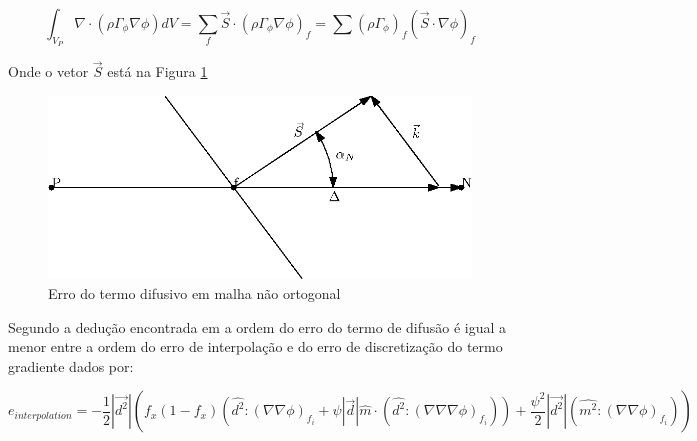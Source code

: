 \begin{equation}
    \int_{V_P} \nabla \cdot (\rho \Gamma_\phi \nabla\phi)dV = \sum_f \vec{S} \cdot (\rho \Gamma_\phi \nabla \phi)_f = \sum (\rho \Gamma_\phi)_f (\vec{S} \cdot \nabla \phi)_f
\end{equation}

Onde o vetor $\vec{S}$ está na Figura \ref{fig:non-orthogonality}

\begin{figure}[]
    \centering
    \includegraphics{fig/non-orthogonality.eps}
    \caption{Erro do termo difusivo em malha não ortogonal}
    \label{fig:non-orthogonality}
\end{figure}





Segundo a dedução encontrada em \cite{Juretic2004} a ordem do erro do termo de difusão é igual a menor entre a ordem do erro de interpolação e do erro de discretização do termo gradiente dados por:

\begin{equation}
    e_{interpolation} = -\frac{1}{2} |\vec{d^2}| (f_x(1-f_x)(\hat{d^2}:(\nabla \nabla \phi)_{f_i} + \psi |\vec{d}| \hat{m} \cdot (\hat{d^2} : (\nabla \nabla \nabla \phi)_{f_i})) + \frac{\psi^2}{2} |\vec{d^2}| (\hat{m^2} : (\nabla \nabla \phi)_{f_i}) )
    \label{eq:2.49}
\end{equation}

